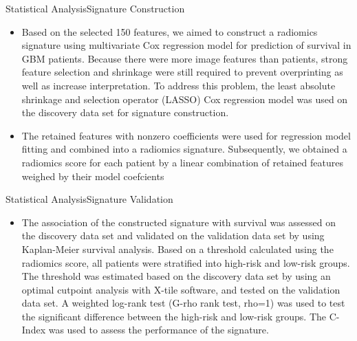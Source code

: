 \documentclass[
]{beamer}
\begin{document}
\begin{frame}{Statistical Analysis}{Signature Construction}
\begin{itemize}
	\item Based on the selected 150 features, we aimed to construct a radiomics signature using
	multivariate Cox regression model for prediction of survival in GBM patients. Because there were more image
	features than patients, strong feature selection and shrinkage were still required to prevent overprinting as well as
	increase interpretation. To address this problem, the least absolute shrinkage and selection operator (LASSO) Cox
	regression model was used on the discovery data set for signature construction.
	\item  The retained features with nonzero coefficients were
	used for regression model fitting and combined into a radiomics signature. Subsequently, we obtained a radiomics
	score for each patient by a linear combination of retained features weighed by their model coefcients
\end{itemize}
\end{frame}

\begin{frame}{Statistical Analysis}{Signature Validation}
\begin{itemize}
	\item The association of the constructed signature with survival was assessed on the discovery
	data set and validated on the validation data set by using Kaplan-Meier survival analysis. Based on a threshold
	calculated using the radiomics score, all patients were stratified into high-risk and low-risk groups. The threshold
	was estimated based on the discovery data set by using an optimal cutpoint analysis with X-tile software, and
	tested on the validation data set. A weighted log-rank test (G-rho rank test, rho=1) was used to test the significant
	difference between the high-risk and low-risk groups. The C-Index was used to assess the performance of
	the signature.
\end{itemize}
\end{frame}
\end{document}
